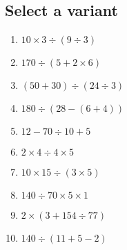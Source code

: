 \documentclass{exam}
\begin{document}
\subsection*{Select a variant}
\begin{enumerate}[1)]
\item $10 \times 3 \div \left(9 \div 3\right)$
\item $170 \div \left(5 + 2 \times 6\right)$
\item $\left(50 + 30\right) \div \left(24 \div 3\right)$
\item $180 \div \left(28 - \left(6 + 4\right)\right)$
\item $12 - 70 \div 10 + 5$
\item $2 \times 4 \div 4 \times 5$
\item $10 \times 15 \div \left(3 \times 5\right)$
\item $140 \div 70 \times 5 \times 1$
\item $2 \times \left(3 + 154 \div 77\right)$
\item $140 \div \left(11 + 5 - 2\right)$
\end{enumerate}
\end{document}
